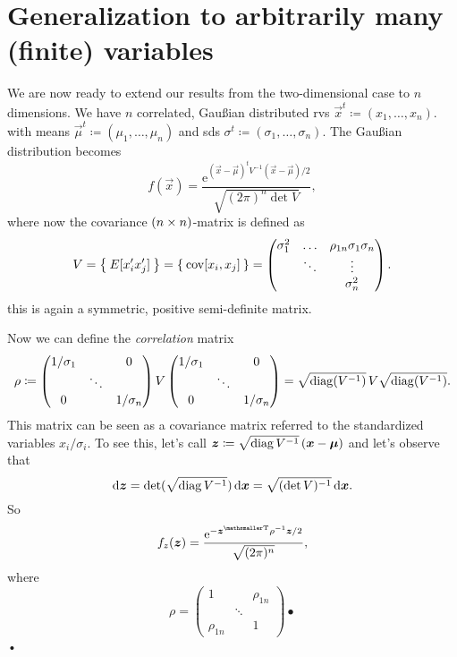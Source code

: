 \documentclass[
	10pt,
	draft
]{scrreprt}
\newcommand{\transpose}[1]{\ensuremath{#1}^{\mathrm{ \mathsmaller T}}}
\newcommand{\eu}{\ensuremath{\mathrm{e}}}
\DeclareMathOperator{\cov}{cov}
\begin{document}
\section{Generalization to arbitrarily many (finite) variables}

We are now ready to extend our results from the two-dimensional case to $n$ dimensions.
We have $n$ correlated, Gau\ss{}ian distributed \acp{rv} $\vec{x}^t \coloneqq(x_1,\dots,x_n)$. with means $\vec{\mu}^t\coloneqq (\mu_1,\dots,\mu_n)$ and \acp{sd} $\sigma^t \coloneqq (\sigma_1,\dots,\sigma_n)$.
The Gau\ss{}ian distribution becomes
\begin{equation}
f(\vec{x}) = \frac{\eu^{(\vec{x}-\vec{\mu})^tV^{-1}(\vec{x}-\vec{\mu})/2}}{\sqrt{(2\pi)^n\det V}},
\end{equation}
where now the covariance $(n\times n)$-matrix is defined as
\begin{equation}
V = \Set{E[x_i'x_j']} = \Set{\cov[x_i,x_j]}=
\begin{pmatrix}
\sigma_1^2	&\dots 	&\rho_{1n}\sigma_1\sigma_n\\
			&\ddots		&\vdots \\
& &\sigma_n^2
\end{pmatrix}.
\end{equation}
this is again a symmetric, positive semi-definite matrix.


Now we can define the \emph{correlation} matrix
\begin{equation}
\rho\coloneqq 
\begin{pmatrix}
1/\sigma_1 & &0\\
 &\ddots & \\
0 & &1/\sigma_n
\end{pmatrix}
V
\begin{pmatrix}
1/\sigma_1 & &0\\
 &\ddots & \\
0 & &1/\sigma_n
\end{pmatrix}
= \sqrt{\operatorname{diag} (V^{-1}) }\, V \sqrt{\operatorname{diag} (V^{-1})}.
\end{equation}
This matrix can be seen as a covariance matrix referred to the standardized variables $x_i/\sigma_i$.
To see this, let's call $\bm{{z}} \coloneqq \sqrt{\operatorname{diag} V^{-1}}\,(\bm{{x}}-\bm{{\mu}})$ and let's observe that
\begin{equation}
\mathop{}\!\mathrm{d}\bm{{z}} = \det(\sqrt{\operatorname{diag} V^{-1} })\mathop{}\!\mathrm{d}\bm{{x}} = \sqrt{(\det V)^{-1}}\mathop{}\!\mathrm{d} \bm{{x}}.
\end{equation}
So
\begin{equation}
f_z(\vec{z}) = \frac{\eu^{-\transpose{\vec{z}} \rho ^{-1} \vec{z}/2}}{\sqrt{(2\pi)^n}},
\end{equation}
where
\begin{equation}
\rho =
\begin{pmatrix}
1	& 	&\rho_{1n} \\
	&\ddots{} 	 & \\
\rho_{1n}	&  &1
\end{pmatrix}•
\end{equation}•
\end{document}
